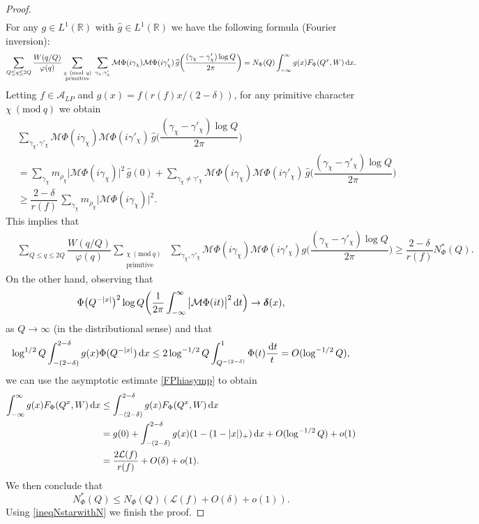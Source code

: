 \documentclass[reqno]{amsart}
\newcommand{\A}{\mathcal{A}}
\renewcommand{\L}{\mathcal{L}}
\renewcommand{\r}{\mathbb{R}}
\newcommand{\ft}{\widehat}
\newcommand{\bo}{\boldsymbol}
\renewcommand{\d}{\,\text{\rm d}}
\begin{document}
\begin{proof}
\begin{align}
\end{align}
For any $g\in L^1(\r)$ with $\ft g\in L^1(\r)$ we have the following formula (Fourier inversion):
\begin{align*}
\sum_{Q\leq q\leq 2Q} \dfrac{W(q/Q)}{\varphi(q)}\displaystyle\sum_{\substack{\chi \ (\mathrm{mod} \ q) \\ \text{primitive}}}\displaystyle\;\sum_{\gamma_\chi, \gamma'_\chi}\mathcal{M}\Phi(i\gamma_\chi)\mathcal{M}\Phi(i\gamma'_\chi)\,\widehat{g}\bigg(\dfrac{(\gamma_\chi-\gamma'_\chi)\log Q}{2\pi}\bigg)
	 =N_{\Phi}(Q)\int_{-\infty}^{\infty}g(x)F_{\Phi}(Q^x,W)\d x .
\end{align*}
Letting $f\in\A_{LP}$ and $g(x)=f(r(f)x/(2-\delta))$, for any primitive character $\chi  \ (\mathrm{mod} \ q)$ we obtain
\begin{align*}
&\sum_{\gamma_\chi, \gamma'_\chi}\mathcal{M}\Phi(i\gamma_\chi)\mathcal{M}\Phi(i\gamma'_\chi)\,\widehat{g}\bigg(\dfrac{(\gamma_\chi-\gamma'_\chi)\log Q}{2\pi}\bigg) \\ & = \displaystyle\sum_{\gamma_\chi}m_{\rho_\chi}\big|\mathcal{M}\Phi(i\gamma_\chi)\big|^2\,\widehat{g}(0) \nonumber + \displaystyle\sum_{\gamma_\chi\neq \gamma'_\chi}\mathcal{M}\Phi(i\gamma_\chi)\mathcal{M}\Phi(i\gamma'_\chi)\,\widehat{g}\bigg(\dfrac{(\gamma_\chi-\gamma'_\chi)\log Q}{2\pi}\bigg) \nonumber \\
    	& \geq \dfrac{2-\delta}{r(f)}\,\displaystyle\sum_{\gamma_\chi}m_{\rho_\chi}\big|\mathcal{M}\Phi(i\gamma_\chi)\big|^2. 
    	\end{align*}
This implies that
\begin{align*}
& \sum_{Q\leq q\leq 2Q} \dfrac{W(q/Q)}{\varphi(q)}\displaystyle\sum_{\substack{\chi \ (\mathrm{mod} \ q) \\ \text{primitive}}}\displaystyle\;\sum_{\gamma_\chi, \gamma'_\chi}\mathcal{M}\Phi(i\gamma_\chi)\mathcal{M}\Phi(i\gamma'_\chi)g\bigg(\dfrac{(\gamma_\chi-\gamma'_\chi)\log Q}{2\pi}\bigg)  \geq \dfrac{2-\delta}{r(f)}N^*_{\Phi}(Q).
\end{align*}
On the other hand, observing that 
$$
\Phi\big(Q^{-|{x}|}\big)^2\log Q \bigg(\dfrac{1}{2\pi}\int_{-\infty}^{\infty}\big|\mathcal{M}\Phi(it)\big|^2\d t\Big)\to {\bo \delta}(x),
$$
as $Q\to \infty$ (in the distributional sense) and that
$$
\log^{1/2} Q \int_{-(2-\delta)}^{2-\delta} g(x) \Phi(Q^{-|x|})\d x \leq 2\log^{-1/2} Q \int_{Q^{-({2-\delta})}}^1 \Phi(t)\frac{\d t}{t} = O(\log^{-1/2} Q),
$$
we can use the asymptotic estimate \eqref{FPhiasymp} to obtain
\begin{align*}
\int_{-\infty}^{\infty}g({x})F_{\Phi}(Q^{x},W)\d{x}
  & \leq \int_{-(2-\delta)}^{2-\delta}g({x})F_{\Phi}(Q^{x},W)\d{x} \\ & =  g(0)+ \int_{-(2-\delta)}^{2-\delta}g({x})(1-(1-|x|)_+)\d x + O(\log^{-1/2} Q) + o(1)
\\ & =\frac{2 \L(f)}{r(f)} + O(\delta) + o(1).
\end{align*}
We then conclude that 
$$N^*_{\Phi}(Q) \leq N_{\Phi}(Q) \left(\L(f) + O(\delta) + o(1) \right).$$
Using \eqref{ineqNstarwithN} we finish the proof.
\end{proof}
\end{document}
